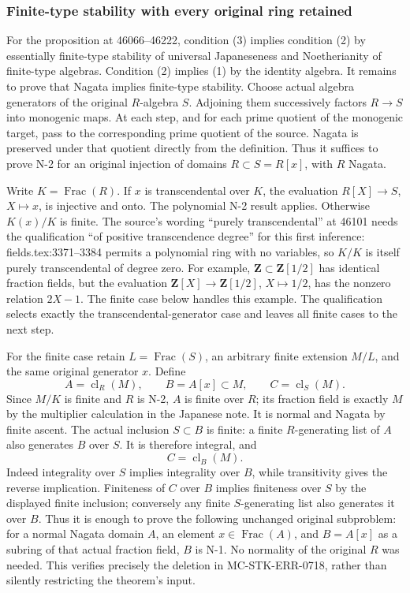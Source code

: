 \subsubsection{Finite-type stability with every original ring retained}\label{finite-type-stability-with-every-original-ring-retained}

For the proposition at 46066--46222, condition (3) implies condition (2) by essentially finite-type stability of universal Japaneseness and Noetherianity of finite-type algebras. Condition (2) implies (1) by the identity algebra. It remains to prove that Nagata implies finite-type stability. Choose actual algebra generators of the original \(R\)-algebra \(S\). Adjoining them successively factors \(R\to S\) into monogenic maps. At each step, and for each prime quotient of the monogenic target, pass to the corresponding prime quotient of the source. Nagata is preserved under that quotient directly from the definition. Thus it suffices to prove N-2 for an original injection of domains \(R\subset S=R[x]\), with \(R\) Nagata.

Write \(K=\operatorname{Frac}(R)\). If \(x\) is transcendental over \(K\), the evaluation \(R[X]\to S\), \(X\mapsto x\), is injective and onto. The polynomial N-2 result applies. Otherwise \(K(x)/K\) is finite. The source's wording ``purely transcendental'' at 46101 needs the qualification ``of positive transcendence degree'' for this first inference: fields.tex:3371--3384 permits a polynomial ring with no variables, so \(K/K\) is itself purely transcendental of degree zero. For example, \(\mathbf Z\subset\mathbf Z[1/2]\) has identical fraction fields, but the evaluation \(\mathbf Z[X]\to\mathbf Z[1/2]\), \(X\mapsto1/2\), has the nonzero relation \(2X-1\). The finite case below handles this example. The qualification selects exactly the transcendental-generator case and leaves all finite cases to the next step.

For the finite case retain \(L=\operatorname{Frac}(S)\), an arbitrary finite extension \(M/L\), and the same original generator \(x\). Define \[
 A=\operatorname{cl}_R(M),\qquad B=A[x]\subset M,
 \qquad C=\operatorname{cl}_S(M).
\] Since \(M/K\) is finite and \(R\) is N-2, \(A\) is finite over \(R\); its fraction field is exactly \(M\) by the multiplier calculation in the Japanese note. It is normal and Nagata by finite ascent. The actual inclusion \(S\subset B\) is finite: a finite \(R\)-generating list of \(A\) also generates \(B\) over \(S\). It is therefore integral, and \[
 C=\operatorname{cl}_B(M).
\] Indeed integrality over \(S\) implies integrality over \(B\), while transitivity gives the reverse implication. Finiteness of \(C\) over \(B\) implies finiteness over \(S\) by the displayed finite inclusion; conversely any finite \(S\)-generating list also generates it over \(B\). Thus it is enough to prove the following unchanged original subproblem: for a normal Nagata domain \(A\), an element \(x\in\operatorname{Frac}(A)\), and \(B=A[x]\) as a subring of that actual fraction field, \(B\) is N-1. No normality of the original \(R\) was needed. This verifies precisely the deletion in MC-STK-ERR-0718, rather than silently restricting the theorem's input.

